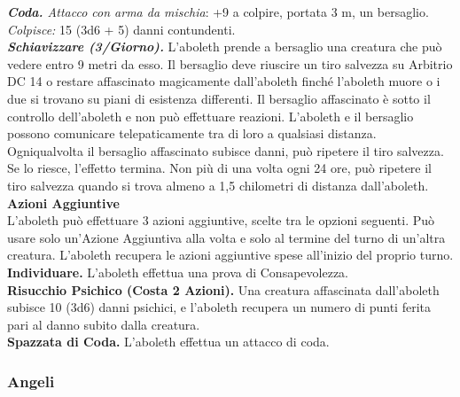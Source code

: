 \begin{multicols}{2}
\emph{\textbf{Coda.} Attacco con arma da mischia}: +9 a colpire, portata 3 m, un bersaglio.\\
\emph{Colpisce:} 15 (3d6 + 5) danni contundenti.\\
\emph{\textbf{Schiavizzare (3/Giorno).}} L'aboleth prende a bersaglio
una creatura che può vedere entro 9 metri da esso. Il bersaglio deve
riuscire un tiro salvezza su Arbitrio DC 14 o restare affascinato
magicamente dall'aboleth finché l'aboleth muore o i due si trovano su
piani di esistenza differenti. Il bersaglio affascinato è sotto il
controllo dell'aboleth e non può effettuare reazioni. L'aboleth e il
bersaglio possono comunicare telepaticamente tra di loro a qualsiasi
distanza.\\
Ogniqualvolta il bersaglio affascinato subisce danni, può ripetere il
tiro salvezza. Se lo riesce, l'effetto termina. Non più di una volta
ogni 24 ore, può ripetere il tiro salvezza quando si trova almeno a 1,5
chilometri di distanza dall'aboleth.\\
\textbf{Azioni Aggiuntive}\\
L'aboleth può effettuare 3 azioni aggiuntive, scelte tra le opzioni seguenti. Può usare solo un'Azione Aggiuntiva alla volta e solo al termine del turno di un'altra creatura. L'aboleth recupera le azioni aggiuntive spese all'inizio del proprio turno.\\
\textbf{Individuare.} L'aboleth effettua una prova di Consapevolezza. \\
\textbf{Risucchio Psichico (Costa 2 Azioni).} Una creatura affascinata dall'aboleth subisce 10 (3d6) danni psichici, e l'aboleth recupera un numero di punti ferita pari al danno subito dalla creatura.\\
\textbf{Spazzata di Coda.} L'aboleth effettua un attacco di coda.

\subsubsection{Angeli}


\end{multicols}
